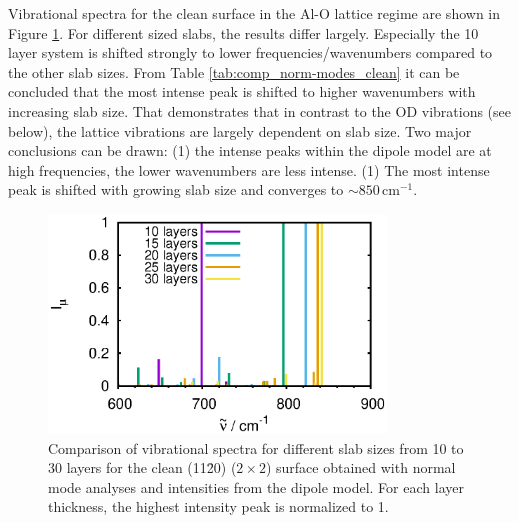 \documentclass[11pt,DIV=13,BCOR=5mm,a4paper,headinclude]{scrbook}
\begin{document}
Vibrational spectra for the clean surface in the Al-O lattice regime are shown in Figure \ref{abb:clean_comp_layer}.
For different sized slabs, the results differ largely.
Especially the 10 layer system is shifted strongly to lower frequencies/wavenumbers compared to the other slab sizes.
From Table \ref{tab:comp_norm-modes_clean} it can be concluded that the most intense peak is shifted to higher wavenumbers with increasing slab size.
That demonstrates that in contrast to the OD vibrations (see below), the lattice vibrations are largely dependent on slab size.
Two major conclusions can be drawn: (1) the intense peaks within the dipole model are at high frequencies, the lower wavenumbers are less intense. (1) The most intense peak is shifted with growing slab size and converges to $\sim 850\,$cm$^{-1}$.


\begin{figure}[!h]
 \centering
 \includegraphics[width=0.8\textwidth]{figures/11-20/comp_freq_surf.eps}
 \caption{Comparison of vibrational spectra for different slab sizes from 10 to 30 layers for the clean (11\=20) ($2\times 2$) surface obtained with normal mode analyses and intensities from the dipole model.
 For each layer thickness, the highest intensity peak is normalized to 1.}
 \label{abb:clean_comp_layer}
\end{figure}
\end{document}
